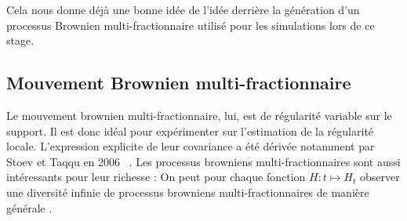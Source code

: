 Cela nous donne déjà une bonne idée de l'idée derrière la génération d'un processus Brownien multi-fractionnaire utilisé pour les simulations lors de ce stage.

\subsection{Mouvement Brownien multi-fractionnaire}

Le mouvement brownien multi-fractionnaire, lui, est de régularité variable sur le support. Il est donc idéal pour expérimenter sur l'estimation de la régularité locale. L'expression explicite de leur covariance a été dérivée notamment par Stoev et Taqqu en 2006 ~\cite{mfbm-howrich}. Les processus browniens multi-fractionnaires sont aussi intéressants pour leur \og richesse \fg : On peut pour chaque fonction $H : t \mapsto H_t$ observer \og une diversité infinie de processus browniens multi-fractionnaires de manière générale \fg.~\cite{mfbm-howrich}